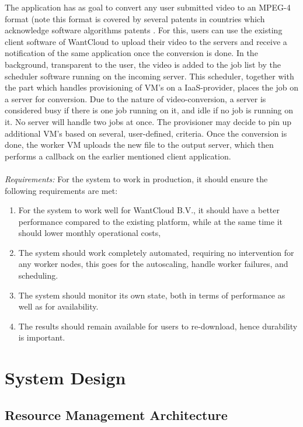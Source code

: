 \documentclass[a4paper]{IEEEtran}
\begin{document}
The application has as goal to convert any user submitted video to an MPEG-4 format (note this format is covered by several patents in countries which acknowledge software algorithms patents \cite{mpegla}.
For this, users can use the existing client software of WantCloud to upload their video to the servers and receive a notification of the same application once the conversion is done.
In the background, transparent to the user, the video is added to the job list by the scheduler software running on the incoming server.
This scheduler, together with the part which handles provisioning of VM's on a IaaS-provider, places the job on a server for conversion.
Due to the nature of video-conversion, a server is considered busy if there is one job running on it, and idle if no job is running on it. 
No server will handle two jobs at once.
The provisioner may decide to pin up additional VM's based on several, user-defined, criteria.
Once the conversion is done, the worker VM uploads the new file to the output server, which then performs a callback on the earlier mentioned client application.\\
\\
\textit{Requirements:} For the system to work in production, it should ensure the following requirements are met:

\begin{enumerate}
\item For the system to work well for WantCloud B.V., it should have a better performance compared to the existing platform, while at the same time it should lower monthly operational costs,
\item The system should work completely automated, requiring no intervention for any worker nodes, this goes for the autoscaling, handle worker failures, and scheduling.
\item The system should monitor its own state, both in terms of performance as well as for availability.
\item The results should remain available for users to re-download, hence durability is important.

\end{enumerate}


\section{System Design}

\subsection{Resource Management Architecture}
\end{document}
